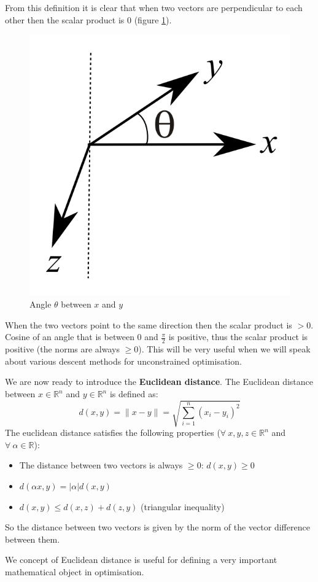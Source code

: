 From this definition it is clear that when two vectors are perpendicular to each other then the scalar product is 0 (figure \ref{fig:scalar}).
\begin{figure}
    \centering
    \includegraphics[scale=0.4]{figures/1/2-scalar.png}
    \caption{Angle $\theta$ between $x$ and $y$}
    \label{fig:scalar}
\end{figure}
When the two vectors point to the same direction then the scalar product is $> 0$. Cosine of an angle that is between 0 and $\frac{\pi}{2}$ is positive, thus the scalar product is positive (the norms are always $\geq 0$). This will be very useful when we will speak about various descent methods for unconstrained optimisation.
\par We are now ready to introduce the \textbf{Euclidean distance}. The Euclidean distance between $x \in \mathbb{R}^n$ and $y \in \mathbb{R}^n$ is defined as:
\begin{equation}
    d(x,y) = \lVert x - y \rVert = \sqrt{\sum_{i=1}^n(x_i - y_i)^2}
    \label{eq:euclidean_distance}
\end{equation}
The euclidean distance satisfies the following properties ($\forall\ x,y,z \in \mathbb{R}^n$ and $\forall\ \alpha \in \mathbb{R}$):
\begin{itemize}
    \item The distance between two vectors is always $\geq 0$: $d(x,y) \geq 0$
    \item $d(\alpha x, y) = |\alpha|d(x,y)$
    \item $d(x,y) \leq d(x,z) + d(z,y)$ (triangular inequality)
\end{itemize}
So the distance between two vectors is given by the norm of the vector difference between them.
\par We concept of Euclidean distance is useful for defining a very important mathematical object in optimisation.
%
